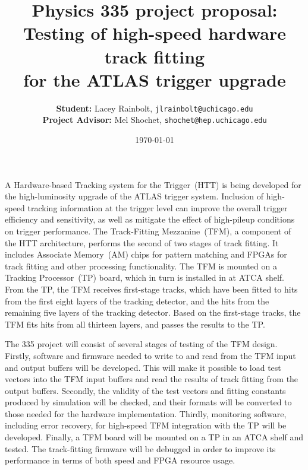 \documentclass[12pt]{article}
\title{\Large %
	Physics 335 project proposal: \\
	Testing of high-speed hardware track fitting \\ for the ATLAS trigger upgrade}
\author{\textbf{Student:} Lacey Rainbolt, \texttt{jlrainbolt@uchicago.edu} \\ \textbf{Project Advisor:} Mel Shochet, \texttt{shochet@hep.uchicago.edu}}
\date{\today}
\begin{document}
\maketitle


A Hardware-based Tracking system for the Trigger~(HTT) is being developed for the high-luminosity upgrade of the ATLAS trigger system.  Inclusion of high-speed tracking information at the trigger level can improve the overall trigger efficiency and sensitivity, as well as mitigate the effect of high-pileup conditions on trigger performance.  The Track-Fitting Mezzanine~(TFM), a component of the HTT architecture, performs the second of two stages of track fitting.  It includes Associate Memory~(AM) chips for pattern matching and FPGAs for track fitting and other processing functionality.  The TFM is mounted on a Tracking Processor~(TP) board, which in turn is installed in at ATCA shelf.  From the TP, the TFM receives first-stage tracks, which have been fitted to hits from the first eight layers of the tracking detector, and the hits from the remaining five layers of the tracking detector.  Based on the first-stage tracks, the TFM fits hits from all thirteen layers, and passes the results to the TP.

The 335 project will consist of several stages of testing of the TFM design.  Firstly, software and firmware needed to write to and read from the TFM input and output buffers will be developed.  This will make it possible to load test vectors into the TFM input buffers and read the results of track fitting from the output buffers.  Secondly, the validity of the test vectors and fitting constants produced by simulation will be checked, and their formats will be converted to those needed for the hardware implementation.  Thirdly, monitoring software, including error recovery, for high-speed TFM integration with the TP will be developed.  Finally, a TFM board will be mounted on a TP in an ATCA shelf and tested.  The track-fitting firmware will be debugged in order to improve its performance in terms of both speed and FPGA resource usage.

\end{document}
